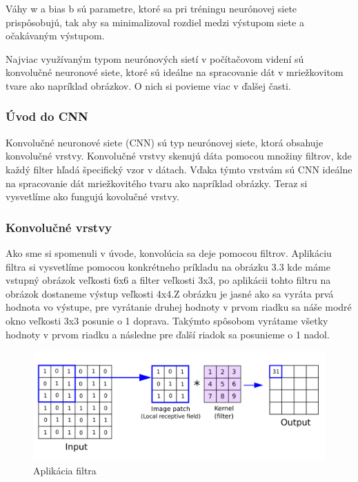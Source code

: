 Váhy w a bias b sú parametre, ktoré sa pri tréningu neurónovej siete prispôsobujú, tak aby sa minimalizoval rozdiel medzi výstupom siete a očakávaným výstupom.

Najviac využívaným typom neurónových sietí v počítačovom videní sú konvolučné neuronové siete, ktoré sú ideálne na spracovanie dát v mriežkovitom tvare ako napríklad obrázkov. O nich si povieme viac v ďalšej časti.

\subsubsection{Úvod do CNN}
\hspace{\parindent} Konvolučné neuronové siete (CNN) \cite{CNN} sú typ neurónovej siete, ktorá obsahuje konvolučné vrstvy. Konvolučné vrstvy skenujú dáta pomocou množiny filtrov, kde každý filter hľadá špecifický vzor v dátach. Vďaka týmto vrstvám sú CNN ideálne na spracovanie dát mriežkovitého tvaru ako napríklad obrázky. Teraz si vysvetlíme ako fungujú kovolučné vrstvy.

\subsubsection{Konvolučné vrstvy}
\hspace{\parindent} 
Ako sme si spomenuli v úvode, konvolúcia sa deje pomocou filtrov. Aplikáciu filtra si vysvetlíme pomocou konkrétneho príkladu na obrázku 3.3 kde máme vstupný obrázok veľkosti 6x6 a filter veľkosti 3x3, po aplikácii tohto filtru na obrázok dostaneme výstup veľkosti 4x4.Z obrázku je jasné ako sa vyráta prvá  hodnota vo výstupe, pre vyrátanie druhej hodnoty v prvom riadku sa náše modré okno veľkosti 3x3 posunie o 1 doprava. Takýmto spôsobom vyrátame všetky hodnoty v prvom riadku a následne pre ďalší riadok sa posunieme o 1 nadol. 

\begin{figure}[!hbt]
\includegraphics[width=\textwidth]{images/filter.png}
\centering
\caption{Aplikácia filtra}
\label{fig:image}
\end{figure}

